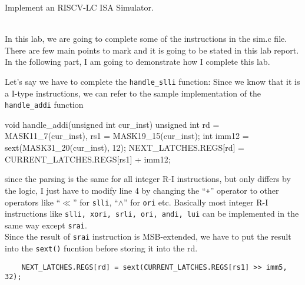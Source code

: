 \documentclass[10pt, a4paper]{article}
\begin{document}
\begin{qNoMark}
Implement an RISCV-LC ISA Simulator. 
\end{qNoMark}

\begin{ans}
\\\indent In this lab, we are going to complete some of the instructions in the sim.c file. 
There are few main points to mark and it is going to be stated in this lab report. 
In the following part, I am going to demonstrate how I complete this lab. 

Let's say we have to complete the \texttt{handle\_slli} function: 
Since we know that it is a I-type instructions, we can refer to the sample implementation of the \texttt{handle\_addi} function
\begin{code}
void handle_addi(unsigned int cur_inst) {
    unsigned int rd = MASK11_7(cur_inst), rs1 = MASK19_15(cur_inst);
    int imm12 = sext(MASK31_20(cur_inst), 12);
    NEXT_LATCHES.REGS[rd] = CURRENT_LATCHES.REGS[rs1] + imm12;
}
\end{code}
since the parsing is the same for all integer R-I instructions, but only differs by the logic, I just have to modify line 4
by changing the ``\texttt{+}'' operator to other operators like ``$\ll$'' for \texttt{slli}, ``$\wedge$'' for \texttt{ori} etc. 
Basically most integer R-I instructions like \texttt{slli, xori, srli, ori, andi, lui} can be implemented in the same way except \texttt{srai}. 
\\Since the result of \texttt{srai} instruction is MSB-extended, we have to put the result into the \texttt{sext()} fucntion before storing it into the rd. 
\begin{verbatim}
    NEXT_LATCHES.REGS[rd] = sext(CURRENT_LATCHES.REGS[rs1] >> imm5, 32);
\end{verbatim}



\end{ans}
\end{document}
